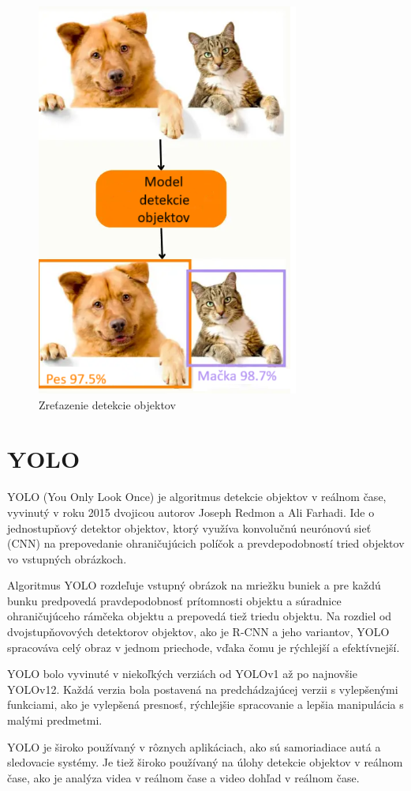 \begin{figure}[H]
    \centering
    \includegraphics[width=0.45\linewidth]{figures/ODmodel.png}
    \caption{Zreťazenie detekcie objektov \label{ODmodel}}
    \label{fig:enter-label}
\end{figure}

\section{YOLO}

YOLO (You Only Look Once) je algoritmus detekcie objektov v reálnom čase, vyvinutý v roku 2015 dvojicou autorov Joseph Redmon a Ali Farhadi.
Ide o jednostupňový detektor objektov, ktorý využíva konvolučnú neurónovú sieť (CNN) na prepovedanie ohraničujúcich políčok a prevdepodobností tried objektov vo vstupných obrázkoch.

Algoritmus YOLO rozdeľuje vstupný obrázok na mriežku buniek a pre každú bunku predpovedá pravdepodobnosť prítomnosti objektu a súradnice ohraničujúceho rámčeka objektu a prepovedá tiež triedu objektu.
Na rozdiel od dvojstupňovových detektorov objektov, ako je R-CNN a jeho variantov, YOLO spracováva celý obraz v jednom priechode, vďaka čomu je rýchlejší a efektívnejší.

YOLO bolo vyvinuté v niekoľkých verziách od YOLOv1 až po najnovšie YOLOv12. Každá verzia bola postavená na predchádzajúcej verzii s vylepšenými funkciami, ako je vylepšená presnosť, rýchlejšie spracovanie a lepšia manipulácia s malými predmetmi.

YOLO je široko používaný v rôznych aplikáciach, ako sú samoriadiace autá a sledovacie systémy.
Je tiež široko používaný na úlohy detekcie objektov v reálnom čase, ako je analýza videa v reálnom čase a video dohľad v reálnom čase.

